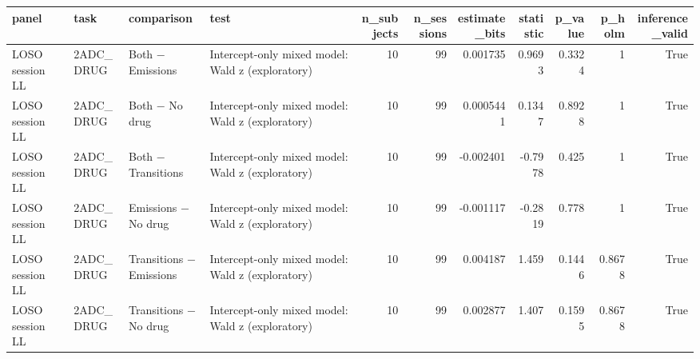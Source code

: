 \begin{tabular}{llllrrrrrrr}
\toprule
panel & task & comparison & test & n\_subjects & n\_sessions & estimate\_bits & statistic & p\_value & p\_holm & inference\_valid \\
\midrule
LOSO session LL & 2ADC\_DRUG & Both − Emissions & Intercept-only mixed model: Wald z (exploratory) & 10 & 99 & 0.001735 & 0.9693 & 0.3324 & 1 & True \\
LOSO session LL & 2ADC\_DRUG & Both − No drug & Intercept-only mixed model: Wald z (exploratory) & 10 & 99 & 0.0005441 & 0.1347 & 0.8928 & 1 & True \\
LOSO session LL & 2ADC\_DRUG & Both − Transitions & Intercept-only mixed model: Wald z (exploratory) & 10 & 99 & -0.002401 & -0.7978 & 0.425 & 1 & True \\
LOSO session LL & 2ADC\_DRUG & Emissions − No drug & Intercept-only mixed model: Wald z (exploratory) & 10 & 99 & -0.001117 & -0.2819 & 0.778 & 1 & True \\
LOSO session LL & 2ADC\_DRUG & Transitions − Emissions & Intercept-only mixed model: Wald z (exploratory) & 10 & 99 & 0.004187 & 1.459 & 0.1446 & 0.8678 & True \\
LOSO session LL & 2ADC\_DRUG & Transitions − No drug & Intercept-only mixed model: Wald z (exploratory) & 10 & 99 & 0.002877 & 1.407 & 0.1595 & 0.8678 & True \\
\bottomrule
\end{tabular}
